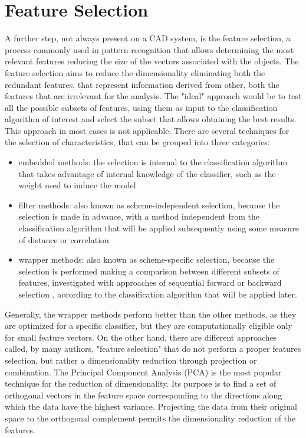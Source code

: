 \section{Feature Selection} \label{FS}
A further step, not always present on a CAD system, is the feature selection, a process commonly used in pattern recognition that allows determining the most relevant features reducing the size of the vectors associated with the objects. The feature selection aims to reduce the dimensionality eliminating both the redundant features, that represent information derived from other, both the features that are irrelevant for
the analysis. The "ideal" approach would be to test all the possible subsets of features, using them as input to the classification algorithm of interest and select the subset that allows obtaining the best results. This approach in most cases is not applicable. There are several techniques for the selection of characteristics, that can be grouped into three categories:
\begin{itemize}
	\item embedded methods: the selection is internal to the classification algorithm that takes advantage of internal knowledge of the classifier, such as the weight used to induce the model \cite{Duda}
	\item filter methods: also known as scheme-independent selection, because the selection is made in advance, with a method independent from the classification algorithm that will be applied subsequently using some measure of distance or correlation \cite{Yu}
	\item wrapper methods: also known as scheme-specific selection, because the selection is performed making a comparison between different subsets of features, investigated with approaches of sequential forward or backward selection \cite{Kittler}, according to the classification algorithm that will be applied later.
\end{itemize}
Generally, the wrapper methods perform better than the other methods, as they are optimized for a specific classifier, but they are computationally eligible only for small feature vectors.
On the other hand, there are different approaches called, by many authors, "feature selection" that do not perform a proper features selection, but rather a dimensionality reduction through projection or combination. The Principal Component Analysis (\acs{PCA}) \cite{Wold} is the most popular technique for the reduction of dimensionality. Its purpose is to find a set of orthogonal vectors in the feature space corresponding to the directions along which the data have the highest variance. Projecting the data from their original space to the orthogonal complement permits the dimensionality reduction of the features. 
